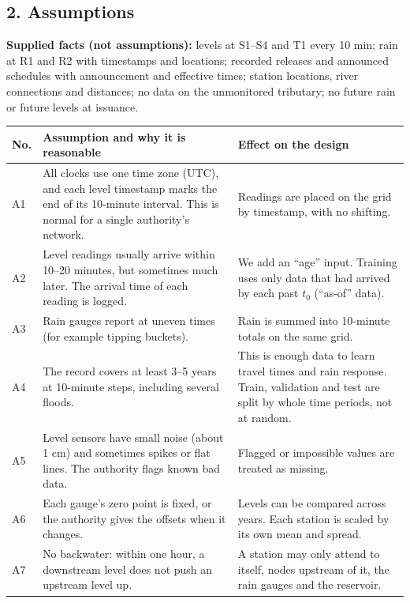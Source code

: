 \documentclass[11pt,a4paper]{article}
\begin{document}
\subsection*{2. Assumptions}

\textbf{Supplied facts (not assumptions):} levels at S1--S4 and T1 every 10 min; rain at R1 and R2 with timestamps and locations; recorded releases and announced schedules with announcement and effective times; station locations, river connections and distances; no data on the unmonitored tributary; no future rain or future levels at issuance.

\begin{longtable}{|L{0.8cm}|L{7.5cm}|L{7.3cm}|}
\hline
\textbf{No.} & \textbf{Assumption and why it is reasonable} & \textbf{Effect on the design} \\ \hline
\endhead
A1 & All clocks use one time zone (UTC), and each level timestamp marks the end of its 10-minute interval. This is normal for a single authority's network. & Readings are placed on the grid by timestamp, with no shifting. \\ \hline
A2 & Level readings usually arrive within 10--20 minutes, but sometimes much later. The arrival time of each reading is logged. & We add an ``age'' input. Training uses only data that had arrived by each past $t_0$ (``as-of'' data). \\ \hline
A3 & Rain gauges report at uneven times (for example tipping buckets). & Rain is summed into 10-minute totals on the same grid. \\ \hline
A4 & The record covers at least 3--5 years at 10-minute steps, including several floods. & This is enough data to learn travel times and rain response. Train, validation and test are split by whole time periods, not at random. \\ \hline
A5 & Level sensors have small noise (about 1 cm) and sometimes spikes or flat lines. The authority flags known bad data. & Flagged or impossible values are treated as missing. \\ \hline
A6 & Each gauge's zero point is fixed, or the authority gives the offsets when it changes. & Levels can be compared across years. Each station is scaled by its own mean and spread. \\ \hline
A7 & No backwater: within one hour, a downstream level does not push an upstream level up. & A station may only attend to itself, nodes upstream of it, the rain gauges and the reservoir. \\ \hline

\end{longtable}
\end{document}

